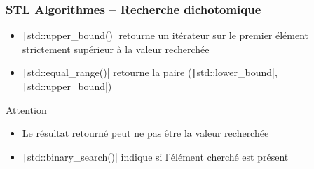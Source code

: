 \documentclass[C++.tex]{subfiles}
\begin{document}
\begin{frame}[fragile]
	\frametitle{STL Algorithmes -- Recherche dichotomique}
	\begin{itemize}
		\item \texttt|std::upper_bound()| retourne un itérateur sur le premier élément strictement supérieur à la valeur recherchée
		\item \texttt|std::equal_range()| retourne la paire (\texttt|std::lower_bound|, \texttt|std::upper_bound|)
	\end{itemize}

	\begin{alertblock}{Attention}
		\begin{itemize}
			\item Le résultat retourné peut ne pas être la valeur recherchée
		\end{itemize}
	\end{alertblock}

	\begin{itemize}
		\item \texttt|std::binary_search()| indique si l'élément cherché est présent
	\end{itemize}
\end{frame}
\end{document}
